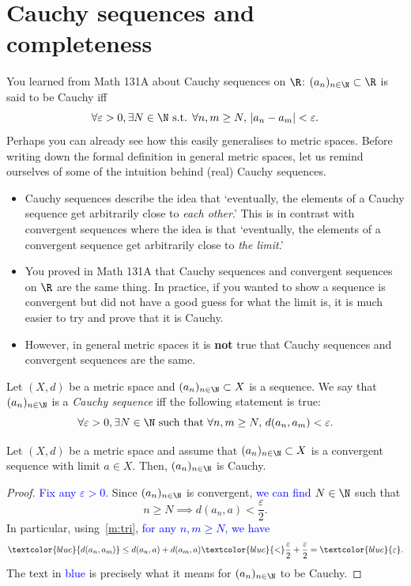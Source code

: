 \section{Cauchy sequences and completeness}
\label{sec:Cauchy}
You learned from Math 131A about Cauchy sequences on $\R$: $(a_n)_{n\in\N}\subset \R$ is said to be Cauchy iff
\[
\forall \varepsilon>0,\exists N\in\N\text{ s.t. }\forall n,m\ge N, \, |a_n-a_m|<\varepsilon.
\]
Perhaps you can already see how this easily generalises to metric spaces. Before writing down the formal definition in general metric spaces, let us remind ourselves of some of the intuition behind (real) Cauchy sequences.
\begin{rem}
	\begin{itemize}
		\item Cauchy sequences describe the idea that `eventually, the elements of a Cauchy sequence get arbitrarily close to \textit{each other}.' This is in contrast with convergent sequences where the idea is that `eventually, the elements of a convergent sequence get arbitrarily close to \textit{the limit}.'
		\item You proved in Math 131A that Cauchy sequences and convergent sequences on $\R$ are the same thing. In practice, if you wanted to show a sequence is convergent but did not have a good guess for what the limit is, it is much easier to try and prove that it is Cauchy.
		\item However, in general metric spaces it is \textbf{not} true that Cauchy sequences and convergent sequences are the same.
	\end{itemize}
\end{rem}
\begin{defn}[Cauchy]
\label{defn:Cauchy}
Let $(X,d)$ be a metric space and $(a_n)_{n\in\N}\subset X$ is a sequence. We say that $(a_n)_{n\in\N}$ is a \textit{Cauchy sequence} iff the following statement is true:
\[
\forall \varepsilon>0,\exists N\in\N\text{ such that }\forall n,m\ge N, \, d(a_n,a_m)<\varepsilon.
\]
\end{defn}
\begin{lemma}
	\label{lem:cvg_imp_cauchy}
Let $(X,d)$ be a metric space and assume that $(a_n)_{n\in\N}\subset X$ is a convergent sequence with limit $a\in X$. Then, $(a_n)_{n\in\N}$ is Cauchy.
\end{lemma}
\begin{proof}
\textcolor{blue}{Fix any $\varepsilon>0$.} Since $(a_n)_{n\in\N}$ is convergent, \textcolor{blue}{we can find $N\in\N$} such that
\[
n\ge N \implies d(a_n,a)<\frac{\varepsilon}{2}.
\]
In particular, using~\ref{m:tri}, \textcolor{blue}{for any $n,m\ge N$, we have}
\[
\textcolor{blue}{d(a_n,a_m)} \le d(a_n,a) + d(a_m,a) \textcolor{blue}{<}\frac{\varepsilon}{2} + \frac{\varepsilon}{2} = \textcolor{blue}{\varepsilon}.
\]
The text in \textcolor{blue}{blue} is precisely what it means for $(a_n)_{n\in\N}$ to be Cauchy.
\end{proof}
